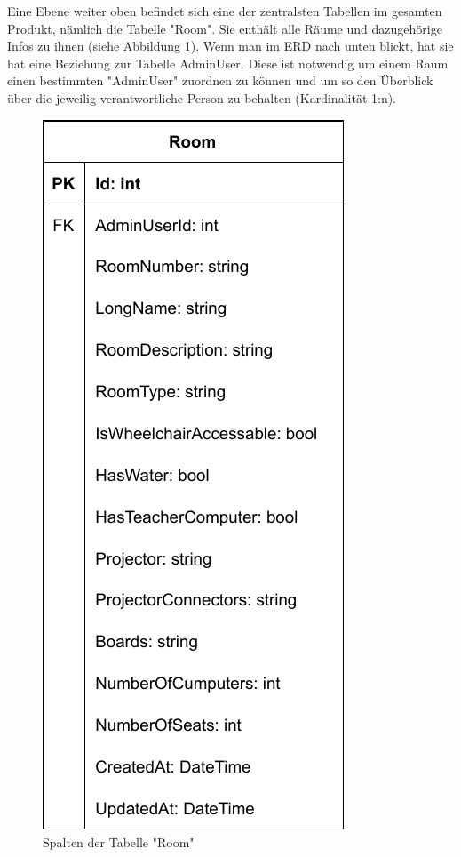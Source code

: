 
Eine Ebene weiter oben befindet sich eine der zentralsten Tabellen im gesamten Produkt, nämlich die Tabelle "Room". Sie enthält alle Räume und dazugehörige Infos zu ihnen (siehe Abbildung \ref{fig:RoomTableColls}). Wenn man im ERD nach unten blickt, hat sie hat eine Beziehung zur Tabelle AdminUser. Diese ist notwendig um einem Raum einen bestimmten "AdminUser" zuordnen zu können und um so den Überblick über die jeweilig verantwortliche Person zu behalten (Kardinalität 1:n).

\begin{figure}[H]
    \centering
    \includegraphics{media/MariaDB/Room.svg.pdf}
    \caption{Spalten der Tabelle "Room"}
    \label{fig:RoomTableColls}
\end{figure}

